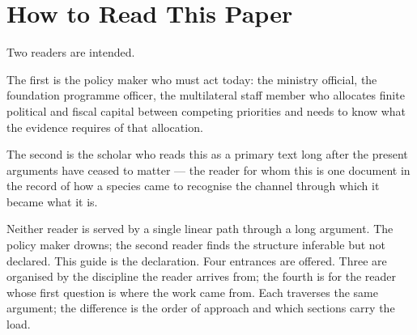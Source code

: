\documentclass[12pt,letterpaper]{article}
\begin{document}
\begin{titlepage}
\begin{abstract}
Easterlin (1981) identified mass schooling as the cause of uneven
development and asked why the whole world wasn't yet developed; his
answer was largely set aside while the field pursued institutions,
geography, and factor accumulation. Tested on its own terms with the
field's own methods, the alternative collapses: log GDP per capita's predictive
power decays within a single generation, and once education's
contribution is residualized out, GDP predicts nothing. Provision
without educated populations produces no durable outcomes.
Institutions are built by educated populations, not the reverse.

\vspace{0.5em}
\noindent\textbf{Keywords:} life-history theory; extended juvenile
dependency; vertical cultural transmission; developmental niche
construction; convergence; fitness components; mass
schooling; home niche; cultural-transmission niche; human development;
demographic transition
\end{abstract}

\thispagestyle{empty}
\end{titlepage}

\setcounter{page}{2}

\newpage

\section*{How to Read This Paper}\label{how-to-read}

Two readers are intended.

The first is the policy maker who must act today: the ministry
official, the foundation programme officer, the multilateral staff
member who allocates finite political and fiscal capital between
competing priorities and needs to know what the evidence requires of
that allocation.

The second is the scholar who reads this as a primary text long after
the present arguments have ceased to matter --- the reader for whom
this is one document in the record of how a species came to recognise
the channel through which it became what it is.

Neither reader is served by a single linear path through a long
argument. The policy maker drowns; the second reader finds the
structure inferable but not declared. This guide is the declaration.
Four entrances are offered. Three are organised by the discipline the
reader arrives from; the fourth is for the reader whose first question
is where the work came from. Each traverses the same argument; the
difference is the order of approach and which sections carry the load.
\end{document}
